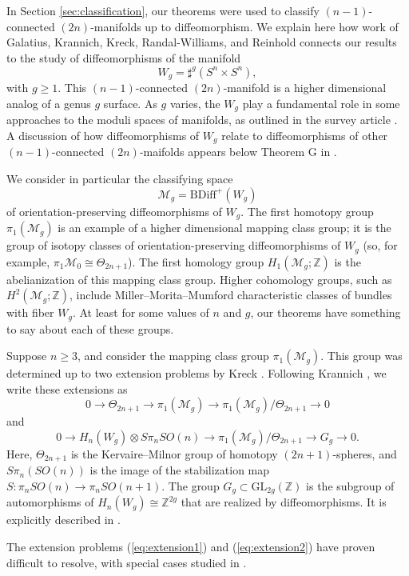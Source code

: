 
In Section \ref{sec:classification}, our theorems were used to classify $(n-1)$-connected $(2n)$-manifolds up to diffeomorphism.
We explain here how work of Galatius, Krannich, Kreck, Randal-Williams, and Reinhold connects our results to the study of diffeomorphisms of the manifold
$$W_g = \sharp^{g} \left( S^n \times S^n \right),$$
with $g \ge 1$.
This $(n-1)$-connected $(2n)$-manifold is a higher dimensional analog of a genus $g$ surface. 
As $g$ varies, the $W_g$ play a fundamental role in some approaches to the moduli spaces of manifolds, as outlined in the survey article \cite{GRHandbook}.
A discussion of how diffeomorphisms of $W_g$ relate to diffeomorphisms of other $(n-1)$-connected $(2n)$-maifolds appears below Theorem G in \cite{KrannichMappingClass}.

We consider in particular the classifying space
$$\mathcal{M}_{g} = \mathrm{BDiff}^{+}(W_g)$$
of orientation-preserving diffeomorphisms of $W_{g}$.
The first homotopy group $\pi_1(\mathcal{M}_{g})$ is an example of a higher dimensional mapping class group; it is the group of isotopy classes of orientation-preserving diffeomorphisms of $W_g$ (so, for example, $\pi_1 \mathcal{M}_0 \cong \Theta_{2n+1}$).  The first homology group $H_1(\mathcal{M}_{g};\mathbb{Z})$ is the abelianization of this mapping class group.  Higher cohomology groups, such as $H^2(\mathcal{M}_g;\mathbb{Z})$, include Miller--Morita--Mumford characteristic classes of bundles with fiber $W_{g}$.  At least for some values of $n$ and $g$, our theorems have something to say about each of these groups.

\begin{rec}
Suppose $n \ge 3$, and consider the mapping class group $\pi_1(\mathcal{M}_g)$.  This group was determined up to two extension problems by Kreck \cite{Kreck}.  Following Krannich \cite{KrannichMappingClass}, we write these extensions as
\begin{equation} \label{eq:extension1}
0 \to \Theta_{2n+1} \to \pi_1(\mathcal{M}_g) \to \pi_1(\mathcal{M}_g)/\Theta_{2n+1} \to 0
\end{equation} 
and
\begin{equation} \label{eq:extension2}
0 \to H_n(W_g) \otimes S\pi_n SO(n) \to \pi_1(\mathcal{M}_g)/\Theta_{2n+1} \to G_g \to 0.
\end{equation}
Here, $\Theta_{2n+1}$ is the Kervaire--Milnor group of homotopy $(2n+1)$-spheres, and $S\pi_n(SO(n))$ is the image of the stabilization map $S:\pi_n SO(n) \to \pi_n SO(n+1)$.  The group $G_g \subset \mathrm{GL}_{2g}(\mathbb{Z})$ is the subgroup of automorphisms of $H_n(W_g) \cong \mathbb{Z}^{2g}$ that are realized by diffeomorphisms.  It is explicitly described in \cite[Section 1.2]{KrannichMappingClass}.

The extension problems (\ref{eq:extension1}) and (\ref{eq:extension2}) have proven difficult to resolve, with special cases studied in \cite{Sato, Fried, Kry02, Kry03, Crowley, GRAbelianQuotients,KrannichMappingClass}.
\end{rec}

